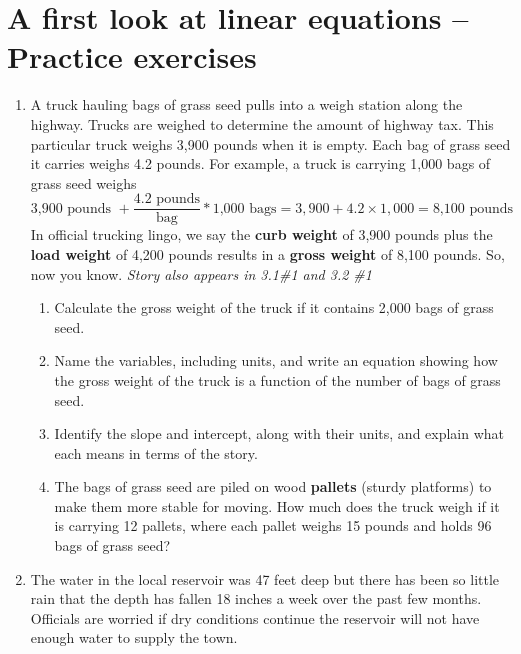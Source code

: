 
\section{A first look at linear equations -- Practice exercises}

\begin{enumerate}

\item A truck hauling bags of grass seed pulls into a weigh station along the highway.  Trucks are weighed to determine the amount of highway tax.  This particular truck weighs 3,900 pounds when it is empty.  Each bag of grass seed it carries weighs 4.2 pounds. 
For example, a truck is carrying 1,000 bags of grass seed weighs 
$$\text{3,900 pounds } + \frac{4.2 \text{ pounds}}{\text{bag}} \ast \text{1,000  bags} = 3,900 + 4.2\times1,000=\text{8,100 pounds}$$ 
In official trucking lingo, we  say the \textbf{curb weight} of 3,900 pounds plus the \textbf{load weight} of 4,200 pounds results in a \textbf{gross weight} of 8,100 pounds.  So, now you know.  \hfill \emph{Story also appears in 3.1\#1 and 3.2 \#1}
\begin{enumerate}
\item Calculate the gross weight of the truck if it contains 2,000 bags of grass seed.   \vfill
\item Name the variables, including units, and  write an equation showing how the gross weight of the truck is a function of the number of bags of grass seed.  \vfill
\item Identify the slope and intercept, along with their units, and explain what each means in terms of the story. \vfill
\item The bags of grass seed are piled on wood \textbf{pallets} (sturdy platforms) to make them more stable for moving. How much does the truck weigh if it is carrying 12 pallets, where each pallet weighs 15 pounds and holds 96 bags of grass seed?    \vfill
\end{enumerate}

\newpage %

\item The water in the local reservoir was 47 feet deep but there has been so little rain that the depth has fallen 18 inches a week over the past few months.  Officials are worried if dry conditions continue the reservoir will not have enough water to supply the town.  


\end{enumerate}
